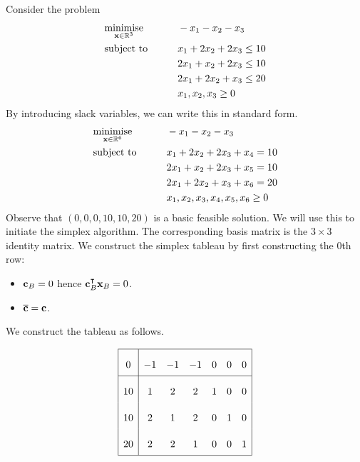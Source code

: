 \begin{example}
    Consider the problem
    \begin{alignat*}{2}
        & \underset{\vb x \in \mathbb R^3}{\text{minimise}} & \qquad & -x_1-x_2-x_3      \\
        & \text{subject to}                                 &        & x_1 + 2x_2 + 2x_3 \leq 10 \\
        &                                                   &        & 2x_1 + x_2 + 2x_3 \leq 10 \\
        &                                                   &        & 2x_1 + 2x_2 + x_3 \leq 20 \\
        &                                                   &        & x_1,x_2,x_3 \geq 0 \\
   \end{alignat*}
   By introducing slack variables, we can write this in standard form.
   \begin{alignat*}{2}
    & \underset{\vb x \in \mathbb R^6}{\text{minimise}} & \qquad & -x_1-x_2-x_3      \\
    & \text{subject to}                                 &        & x_1 + 2x_2 + 2x_3 + x_4 = 10 \\
    &                                                   &        & 2x_1 + x_2 + 2x_3 + x_5 = 10 \\
    &                                                   &        & 2x_1 + 2x_2 + x_3 + x_6 = 20 \\
    &                                                   &        & x_1,x_2,x_3,x_4,x_5,x_6 \geq 0 \\
\end{alignat*}
    Observe that \((0,0,0,10,10,20)\) is a basic feasible solution. We will use this to initiate the simplex algorithm.
    The corresponding basis matrix is the \(3\times 3\) identity matrix.
    We construct the simplex tableau by first constructing the 0th row:
    \begin{itemize}
        \item \( \vb c_B = 0 \) hence \( \vb c_B^\intercal \vb x_B = 0 \).
        \item \( \overline{\vb c} = \vb c \).
    \end{itemize}
    We construct the tableau as follows.

    \[
    \arraycolsep=5pt\def\arraystretch{2.2}
    \begin{array}{|c|cccccc|}\hline
        0 & -1 & -1 & -1 & 0 & 0 & 0 \\\hline
        10 & 1 & 2 & 2 & 1 & 0 & 0 \\
        10 & 2 & 1 & 2 & 0 & 1 & 0 \\
        20 & 2 & 2 & 1 & 0 & 0 & 1 \\\hline
    \end{array}
    \]


\end{example}
